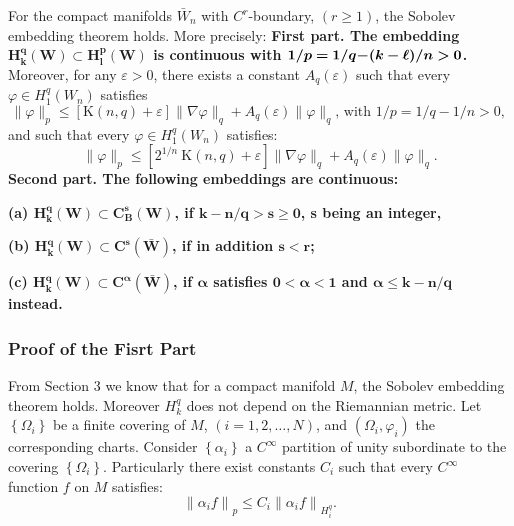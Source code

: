 \documentclass[12pt,hyperref,a4paper,UTF8]{ctexart}
\begin{document}
\begin{Theorem}
    \label{thm54}
    For the compact manifolds ${\bar{W}_n}$ with ${C^r}$-boundary, ${(r \geq 1)}$, the Sobolev embedding theorem holds. More precisely: \textbf{First part. The embedding $\bm{H_k^q(W) \subset H_l^p(W)}$ is continuous with $\bm{1 / p=1 / q-$ $(k-\ell) / n>0}$. }
    Moreover, for any $\varepsilon>0$, there exists a constant $A_q(\varepsilon)$ such
    that every $\varphi \in H_1^q\left(W_n\right)$ satisfies 
    \begin{equation}
    \|\varphi\|_p \leq[\mathrm{K}(n, q)+\varepsilon]\|\nabla \varphi\|_q+A_q(\varepsilon)\|\varphi\|_q \text {,   with } 1 / p=1 / q-1 / n>0 \text {, }
    \label{eq11}
    \end{equation}
    and such that every $\varphi \in H_1^q\left(W_n\right)$ satisfies:
    \begin{equation}
    \|\varphi\|_p \leq\left[2^{1 / n} \mathrm{~K}(n, q)+\varepsilon\right]\|\nabla \varphi\|_q+A_q(\varepsilon)\|\varphi\|_q .
    \label{eq13}
    \end{equation}
    \textbf{Second part. The following embeddings are continuous:}
    
    \textbf{(a) $\bm{H_k^q(W) \subset C_B^s(W)}$, if $\bm{k-n / q>s \geq 0}$, s being an integer,}
    
    \textbf{(b) $\bm{H_k^q(W) \subset C^s(\bar{W})}$, if in addition $\bm{s<r}$;}
    
    \textbf{(c) $\bm{H_k^q(W) \subset C^\alpha(\bar{W})}$, if $\bm{\alpha}$ satisfies $\bm{0<\alpha<1}$ and $\bm{\alpha \leq k-n / q}$ instead.}
\end{Theorem}

\subsubsection{Proof of the Fisrt Part}
From Section 3 we know that for a compact manifold $M$, the Sobolev embedding theorem holds. Moreover $H_k^q$ does not depend on the Riemannian metric.
Let $\left\{\Omega_i\right\}$ be a finite covering of $M$, $(i=1,2, \ldots, N)$, and $\left(\Omega_i, \varphi_i\right)$ the corresponding charts. Consider $\left\{\alpha_i\right\}$ a $C^{\infty}$ partition of unity subordinate to the covering $\left\{\Omega_i\right\}$. 
Particularly there exist constants $C_i$ such that every $C^{\infty}$ function $f$ on $M$ satisfies:
\begin{equation}
\left\|\alpha_i f\right\|_p \leq C_i\left\|\alpha_i f\right\|_{H_i^q} .
\label{eq12}
\end{equation}
\end{document}
